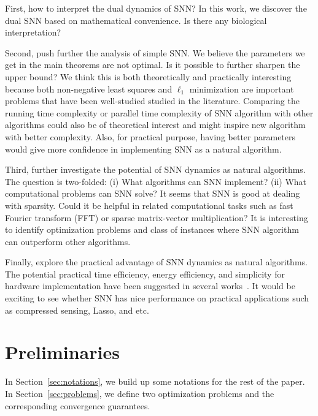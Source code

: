 \documentclass[11pt]{article}
\theoremstyle{remark}
\theoremstyle{definition}
\begin{document}
First, how to interpret the dual dynamics of SNN? In this work, we discover the dual SNN based on mathematical convenience. Is there any biological interpretation?

Second, push further the analysis of simple SNN. We believe the parameters we get in the main theorems are not optimal. Is it possible to further sharpen the upper bound? We think this is both theoretically and practically interesting because both non-negative least squares and $\ell_1$ minimization are important problems that have been well-studied studied in the literature. Comparing the running time complexity or parallel time complexity of SNN algorithm with other algorithms could also be of theoretical interest and might inspire new algorithm with better complexity. Also, for practical purpose, having better parameters would give more confidence in implementing SNN as a natural algorithm.

Third, further investigate the potential of SNN dynamics as natural algorithms. The question is two-folded: (i) What algorithms can SNN implement? (ii) What computational problems can SNN solve? It seems that SNN is good at dealing with sparsity. Could it be helpful in related computational tasks such as fast Fourier transform (FFT) or sparse matrix-vector multiplication? It is interesting to identify optimization problems and class of instances where SNN algorithm can outperform other algorithms.

Finally, explore the practical advantage of SNN dynamics as natural algorithms. The potential practical time efficiency, energy efficiency, and simplicity for hardware implementation have been suggested in several works~\cite{mostafa2015event,binas2015spiking,biswas2016simple}. It would be exciting to see whether SNN has nice performance on practical applications such as compressed sensing, Lasso, and etc.

\section{Preliminaries}\label{sec:preliminaries}
In Section~\ref{sec:notations}, we build up some notations for the rest of the paper. In Section~\ref{sec:problems}, we define two optimization problems and the corresponding convergence guarantees.
\end{document}
